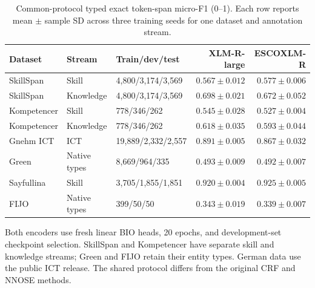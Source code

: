 \begin{table}[!htbp]
\centering\small
\caption{Common-protocol typed exact token-span micro-F1 (0--1). Each row reports mean $\pm$ sample SD across three training seeds for one dataset and annotation stream.}
\label{tab:external-common}
\begin{tabularx}{\linewidth}{@{}L P{.14\linewidth}P{.25\linewidth}rr@{}}
\toprule
Dataset & Stream & Train/dev/test & XLM-R-large & ESCOXLM-R \\
\midrule
SkillSpan & Skill & 4,800/3,174/3,569 & $0.567\pm0.012$ & $0.577\pm0.006$ \\
SkillSpan & Knowledge & 4,800/3,174/3,569 & $0.698\pm0.021$ & $0.672\pm0.052$ \\
Kompetencer & Skill & 778/346/262 & $0.545\pm0.028$ & $0.527\pm0.004$ \\
Kompetencer & Knowledge & 778/346/262 & $0.618\pm0.035$ & $0.593\pm0.044$ \\
Gnehm ICT & ICT & 19,889/2,332/2,557 & $0.891\pm0.005$ & $0.867\pm0.032$ \\
Green & Native types & 8,669/964/335 & $0.493\pm0.009$ & $0.492\pm0.007$ \\
Sayfullina & Skill & 3,705/1,855/1,851 & $0.920\pm0.004$ & $0.925\pm0.005$ \\
FIJO & Native types & 399/50/50 & $0.343\pm0.019$ & $0.339\pm0.007$ \\
\bottomrule
\end{tabularx}
\par\smallskip\RaggedRight\footnotesize Both encoders use fresh linear BIO heads, 20 epochs, and development-set checkpoint selection. SkillSpan and Kompetencer have separate skill and knowledge streams; Green and FIJO retain their entity types. German data use the public ICT release. The shared protocol differs from the original CRF and NNOSE methods.
\end{table}
